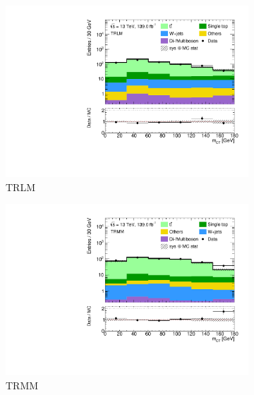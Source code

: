  \begin{figure}
	\centering
	\begin{subfigure}[b]{0.5\linewidth}
		\centering\includegraphics[width=1.0\textwidth]{1Lbb_TRLM_mct}
		\caption{TRLM\label{fig:signal_contamination_TRLM}}
	\end{subfigure}\hfill
	\begin{subfigure}[b]{0.5\linewidth}
		\centering\includegraphics[width=1.0\textwidth]{1Lbb_TRMM_mct}
		\caption{TRMM\label{fig:signal_contamination_TRMM}}
	\end{subfigure}\hfill
	\begin{subfigure}[b]{0.5\linewidth}

\end{subfigure}
\end{figure}
